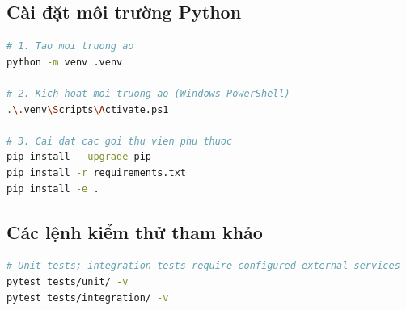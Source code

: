 \subsection{Cài đặt môi trường Python}
\begin{lstlisting}[language=bash]
# 1. Tao moi truong ao
python -m venv .venv

# 2. Kich hoat moi truong ao (Windows PowerShell)
.\.venv\Scripts\Activate.ps1

# 3. Cai dat cac goi thu vien phu thuoc
pip install --upgrade pip
pip install -r requirements.txt
pip install -e .
\end{lstlisting}

\subsection{Các lệnh kiểm thử tham khảo}
\begin{lstlisting}[language=bash]
# Unit tests; integration tests require configured external services
pytest tests/unit/ -v
pytest tests/integration/ -v
\end{lstlisting}
